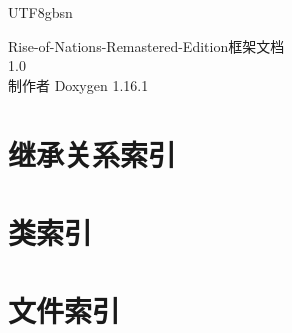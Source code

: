 \documentclass[twoside]{book}
\newcommand{\+}{\discretionary{\mbox{\scriptsize$\hookleftarrow$}}{}{}}
\newcommand{\clearemptydoublepage}{%
    \newpage{\pagestyle{empty}\cleardoublepage}%
  }
\begin{document}
  \raggedbottom
  \begin{CJK}{UTF8}{gbsn}
    \hypersetup{pageanchor=false,
                bookmarksnumbered=true,
                pdfencoding=unicode
               }
  \begin{titlepage}
  \vspace*{7cm}
  \begin{center}%
  {\Large Rise-\/of-\/\+Nations-\/\+Remastered-\/\+Edition框架文档}\\
  [1ex]\large 1.\+0 \\
  \vspace*{1cm}
  {\large 制作者 Doxygen 1.16.1}\\
  \end{center}
  \end{titlepage}
  \clearemptydoublepage
  \tableofcontents
  \clearemptydoublepage
  \hypersetup{pageanchor=true}
\chapter{继承关系索引}

\chapter{类索引}

\chapter{文件索引}


\end{CJK}
\end{document}
